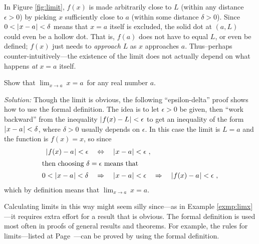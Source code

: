 In Figure \ref{fig:limit}, $f(x)$ is made arbitrarily close to $L$
(within any distance $\epsilon > 0$) by picking $x$ sufficiently close to $a$
(within some distance $\delta > 0$). Since $0 < \lvert\mspace{1mu}x - a\mspace{1mu}\rvert < \delta$ means that
$x = a$ itself is excluded, the solid dot at $(a,L)$ could even be a hollow dot.
That is, $f(a)$ does not have to equal $L$, or even be defined; $f(x)$ just
needs to \emph{approach} $L$ as $x$ approaches $a$. Thus--perhaps
counter-intuitively---the existence of the limit does not actually depend on
what happens \emph{at} $x=a$ itself.
\newpage
\begin{exmp}\label{exmp:limx}
 Show that $\displaystyle\lim_{x \to a} ~x = a\,$ for any real number $a$.\vspace{1mm}
 \par\noindent\emph{Solution:} Though the limit is obvious, the following
``epsilon-delta'' proof shows how to use the formal definition. The idea is to
let $\epsilon > 0$ be given, then ``work backward'' from the inequality
$\lvert\mspace{1mu}f(x)-L\mspace{1mu}\rvert < \epsilon$ to get an inequality of the form $\lvert\mspace{1mu}x-a\mspace{1mu}\rvert < \delta$,
where $\delta > 0$ usually depends on $\epsilon$. In this case the limit is 
$L = a$ and the function is $f(x) = x$, so since
 \begin{align*}
  \lvert\mspace{1mu}f(x)-a\mspace{1mu}\rvert < \epsilon \quad&\Leftrightarrow\quad \lvert\mspace{1mu}x-a\mspace{1mu}\rvert < \epsilon ~,\\
  \intertext{then choosing $\delta = \epsilon$ means that}
  0 < \lvert\mspace{1mu}x-a\mspace{1mu}\rvert < \delta \quad&\Rightarrow\quad \lvert\mspace{1mu}x-a\mspace{1mu}\rvert < \epsilon
  \quad\Rightarrow\quad \lvert\mspace{1mu}f(x)-a\mspace{1mu}\rvert < \epsilon ~,
 \end{align*}
 which by definition means that $\displaystyle\lim_{x \to a} ~x = a$.
\end{exmp}
\divider
\vspace{3mm}

Calculating limits in this way might seem silly since---as in Example
\ref{exmp:limx}---it requires extra effort for a result that is obvious. The
formal definition is used most often in proofs of general results and theorems.
For example, the rules for limits---listed at Page~\pageref{thm:limitrules}---can be proved by
using the formal definition.

